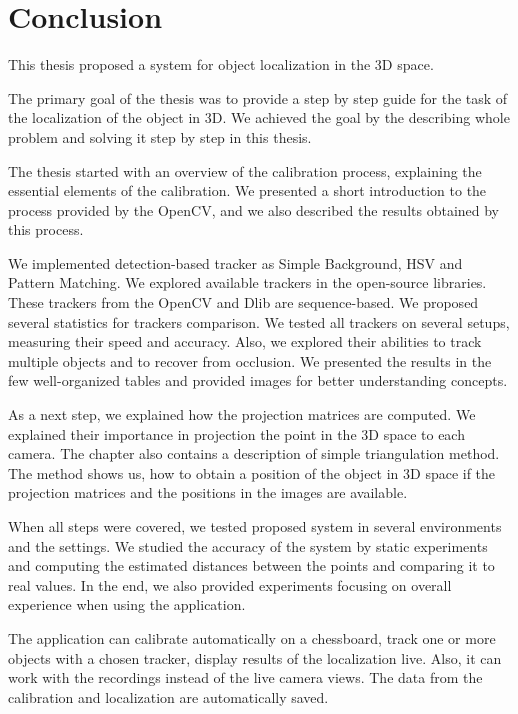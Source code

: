 \chapter*{Conclusion}

This thesis proposed a system for object localization in the 3D space.

The primary goal of the thesis was to provide a step by step guide for the task
of the localization of the object in 3D. We achieved the goal by the describing
whole problem and solving it step by step in this thesis.

The thesis started with an overview of the calibration process, explaining the
essential elements of the calibration. We presented a short introduction to the
process provided by the OpenCV, and we also described the results obtained by
this process.

We implemented detection-based tracker as Simple Background, HSV and Pattern
Matching. We explored available trackers in the open-source libraries. These
trackers from the OpenCV and Dlib are sequence-based. We proposed several
statistics for trackers comparison. We tested all trackers on several setups,
measuring their speed and accuracy. Also, we explored their abilities to track
multiple objects and to recover from occlusion. We presented the results in the
few well-organized tables and provided images for better understanding
concepts.

As a next step, we explained how the projection matrices are computed. We
explained their importance in projection the point in the 3D space to each
camera. The chapter also contains a description of simple triangulation method.
The method shows us, how to obtain a position of the object in 3D space if the
projection matrices and the positions in the images are available.

When all steps were covered, we tested proposed system in several environments
and the settings. We studied the accuracy of the system by static experiments
and computing the estimated distances between the points and comparing it to
real values. In the end, we also provided experiments focusing on overall
experience when using the application.

The application can calibrate automatically on a chessboard, track one or more
objects with a chosen tracker, display results of the localization live. Also,
it can work with the recordings instead of the live camera views. The data from
the calibration and localization are automatically saved.

